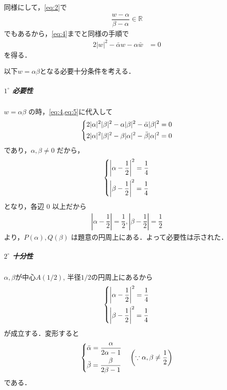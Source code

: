 \documentclass[../../main.tex]{subfiles}
\begin{document}
同様にして，\cref{eq:2}で
\begin{align}
  \dfrac{w-\alpha}{\beta-\alpha} \in \mathbb{R}
\end{align}
でもあるから，\cref{eq:4}までと同様の手順で
\begin{align}
  2|w|^2 - \bar{\alpha}w - \alpha\bar{w} &= 0 \label{eq:5}
\end{align}
を得る．

以下$w=\alpha\beta$となる必要十分条件を考える．

\subparagraph{$1^\circ$ 必要性}

$w = \alpha\beta$ の時，\cref{eq:4,eq:5}に代入して
\begin{align}
  \begin{dcases}
    2|\alpha|^2|\beta|^2 - \alpha|\beta|^2 - \bar{\alpha}|\beta|^2 = 0 \\
    2|\alpha|^2|\beta|^2 - \beta|\alpha|^2 - \bar{\beta}|\alpha|^2 = 0
  \end{dcases}
\end{align}
であり，$\alpha, \beta \neq 0$ だから，
\begin{align}
  \begin{dcases}
    \left|\alpha - \dfrac{1}{2}\right|^2 = \dfrac{1}{4} \\
    \left|\beta - \dfrac{1}{2}\right|^2 = \dfrac{1}{4}
  \end{dcases}
\end{align}
となり，各辺 $0$ 以上だから
\begin{align}
  \left|\alpha - \dfrac{1}{2}\right| = \dfrac{1}{2},
  \left|\beta - \dfrac{1}{2}\right| = \dfrac{1}{2}
\end{align}
より，$P(\alpha), Q(\beta)$ は題意の円周上にある．よって必要性は示された．

\subparagraph{$2^\circ$ 十分性}

$\alpha,\beta$が中心$A(1/2)$, 半径$1/2$の円周上にあるから
\begin{align}
  \begin{dcases}
    \left|\alpha - \dfrac{1}{2}\right|^2 = \dfrac{1}{4} \\
    \left|\beta - \dfrac{1}{2}\right|^2 = \dfrac{1}{4}
  \end{dcases}
\end{align}
が成立する．変形すると
\begin{align}
  \begin{dcases}
    \bar{\alpha} = \dfrac{\alpha}{2\alpha-1} \\
    \bar{\beta} = \dfrac{\beta}{2\beta-1}
  \end{dcases} \quad \left(\because \alpha, \beta \neq \dfrac{1}{2}\right) \label{eq:6}
\end{align}
である．
\end{document}
